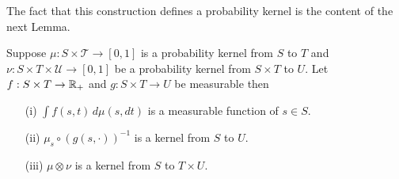 The fact that this construction defines a probability kernel is the
content of the next Lemma.
\begin{lem}\label{KernelTensorProductMeasurability}Suppose $\mu : S \times \mathcal{T} \to [0,1]$ is a
  probability kernel from $S$ to $T$ and $\nu : S \times T \times
  \mathcal{U} \to [0,1]$ be a probability kernel from $S \times T$ to
  $U$.  Let $f : S \times T \to \mathbb{R}_+$ and $g
  : S \times T  \to U$  be measurable then 
\begin{itemize}
\item[(i)] $\int f (s, t) \, d\mu(s,dt)$ is a measurable function of $s \in S$.
\item[(ii)] $\mu_s \circ (g(s, \cdot))^{-1}$ is a kernel from $S$ to $U$.
\item[(iii)] $\mu \otimes \nu$ is a kernel from $S$ to $T \times U$.
\end{itemize}
\end{lem}
